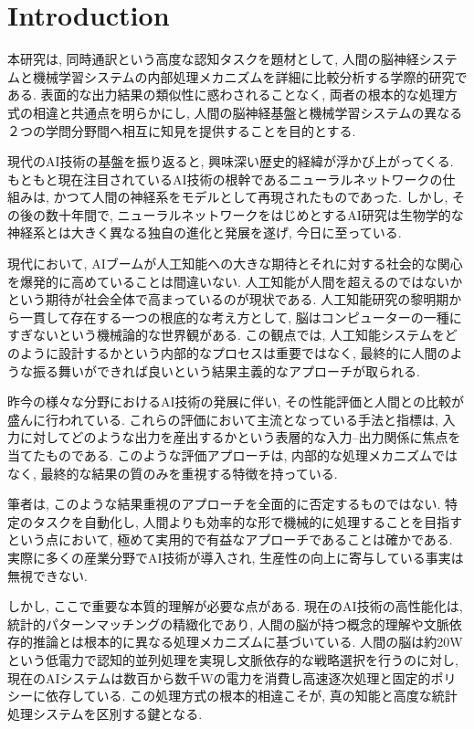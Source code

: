 \section{Introduction}

本研究は, 同時通訳という高度な認知タスクを題材として, 人間の脳神経システムと機械学習システムの内部処理メカニズムを詳細に比較分析する学際的研究である.
表面的な出力結果の類似性に惑わされることなく, 両者の根本的な処理方式の相違と共通点を明らかにし, 人間の脳神経基盤と機械学習システムの異なる２つの学問分野間へ相互に知見を提供することを目的とする.

現代のAI技術の基盤を振り返ると, 興味深い歴史的経緯が浮かび上がってくる.
もともと現在注目されているAI技術の根幹であるニューラルネットワークの仕組みは, かつて人間の神経系をモデルとして再現されたものであった.
しかし, その後の数十年間で, ニューラルネットワークをはじめとするAI研究は生物学的な神経系とは大きく異なる独自の進化と発展を遂げ, 今日に至っている.

現代において, AIブームが人工知能への大きな期待とそれに対する社会的な関心を爆発的に高めていることは間違いない.
人工知能が人間を超えるのではないかという期待が社会全体で高まっているのが現状である.
人工知能研究の黎明期から一貫して存在する一つの根底的な考え方として, 脳はコンピューターの一種にすぎないという機械論的な世界観がある.
この観点では, 人工知能システムをどのように設計するかという内部的なプロセスは重要ではなく, 最終的に人間のような振る舞いができれば良いという結果主義的なアプローチが取られる.

昨今の様々な分野におけるAI技術の発展に伴い, その性能評価と人間との比較が盛んに行われている.
これらの評価において主流となっている手法と指標は, 入力に対してどのような出力を産出するかという表層的な入力--出力関係に焦点を当てたものである.
このような評価アプローチは, 内部的な処理メカニズムではなく, 最終的な結果の質のみを重視する特徴を持っている.

筆者は, このような結果重視のアプローチを全面的に否定するものではない.
特定のタスクを自動化し, 人間よりも効率的な形で機械的に処理することを目指すという点において, 極めて実用的で有益なアプローチであることは確かである.
実際に多くの産業分野でAI技術が導入され, 生産性の向上に寄与している事実は無視できない.

しかし, ここで重要な本質的理解が必要な点がある.
現在のAI技術の高性能化は, 統計的パターンマッチングの精緻化であり, 人間の脳が持つ概念的理解や文脈依存的推論とは根本的に異なる処理メカニズムに基づいている.
人間の脳は約20Wという低電力で認知的並列処理を実現し文脈依存的な戦略選択を行うのに対し, 現在のAIシステムは数百から数千Wの電力を消費し高速逐次処理と固定的ポリシーに依存している.
この処理方式の根本的相違こそが, 真の知能と高度な統計処理システムを区別する鍵となる.

